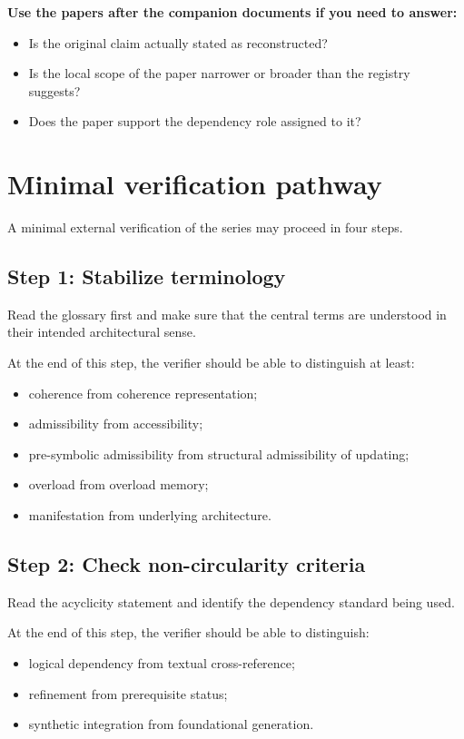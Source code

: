 \documentclass[11pt,a4paper]{article}
\begin{document}
\textbf{Use the papers after the companion documents if you need to answer:}
\begin{itemize}[leftmargin=2em]
	\item Is the original claim actually stated as reconstructed?
	\item Is the local scope of the paper narrower or broader than the registry suggests?
	\item Does the paper support the dependency role assigned to it?
\end{itemize}

\section{Minimal verification pathway}

A minimal external verification of the series may proceed in four steps.

\subsection*{Step 1: Stabilize terminology}

Read the glossary first and make sure that the central terms are understood in their intended
architectural sense.

At the end of this step, the verifier should be able to distinguish at least:
\begin{itemize}[leftmargin=2em]
	\item coherence from coherence representation;
	\item admissibility from accessibility;
	\item pre-symbolic admissibility from structural admissibility of updating;
	\item overload from overload memory;
	\item manifestation from underlying architecture.
\end{itemize}

\subsection*{Step 2: Check non-circularity criteria}

Read the acyclicity statement and identify the dependency standard being used.

At the end of this step, the verifier should be able to distinguish:
\begin{itemize}[leftmargin=2em]
	\item logical dependency from textual cross-reference;
	\item refinement from prerequisite status;
	\item synthetic integration from foundational generation.
\end{itemize}
\end{document}
